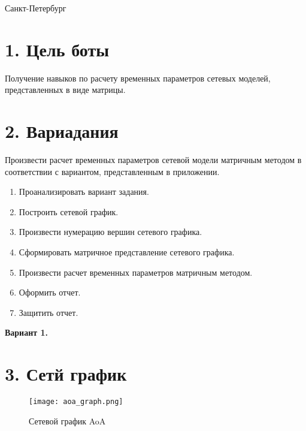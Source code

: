 \documentclass[12pt]{article}
\begin{document}
\begin{titlepage}
\begin{table}[H]
\begin{tabular}{p{1.3in}p{1.0in}p{-0.04in}p{1.63in}p{-0.04in}p{1.63in}}
\end{tabular}
 \end{table}




\vspace{\baselineskip}
\vspace{\baselineskip}
\vspace{\baselineskip}
\vspace{\baselineskip}
\vspace{\baselineskip}
\begin{Center}
Санкт-Петербург \the\year{}
\end{Center}\par
\end{titlepage}

\section*{1. Цель боты}
Получение навыков по расчету временных параметров сетевых моделей, представленных в виде матрицы.

\section*{2. Вариадания}
Произвести расчет временных параметров сетевой модели матричным методом в соответствии с вариантом, представленным в приложении.

\begin{enumerate}
    \item Проанализировать вариант задания.
    \item Построить сетевой график.
    \item Произвести нумерацию вершин сетевого графика.
    \item Сформировать матричное представление сетевого графика.
    \item Произвести расчет временных параметров матричным методом.
    \item Оформить отчет.
    \item Защитить отчет.
\end{enumerate}

\textbf{Вариант 1.}

\section*{3. Сетй график}
\begin{figure}[H]
    \centering
    \texttt{[image: aoa\_graph.png]}
    \caption{Сетевой график AoA}
\end{figure}
\end{document}
